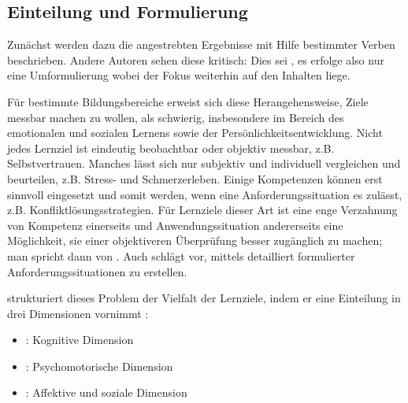 \documentclass[
  twoside,
  parskip=half-,
]{scrreprt}
\begin{document}
\subsection{Einteilung und Formulierung}
Zunächst werden dazu die angestrebten Ergebnisse mit Hilfe bestimmter Verben beschrieben.  Andere Autoren sehen diese  kritisch: Dies sei , es erfolge also nur eine Umformulierung wobei der Fokus weiterhin auf den Inhalten liege.

Für bestimmte Bildungsbereiche erweist sich diese Herangehensweise, Ziele messbar machen zu wollen, als schwierig, insbesondere im Bereich des emotionalen und sozialen Lernens sowie der Persönlichkeitsentwicklung. Nicht jedes Lernziel ist eindeutig beobachtbar oder objektiv messbar, z.B.  Selbstvertrauen. Manches lässt sich nur subjektiv und individuell vergleichen und beurteilen, z.B. Stress- und Schmerzerleben. Einige Kompetenzen können erst sinnvoll eingesetzt und somit  werden, wenn eine Anforderungssituation es zulässt, z.B. Konfliktlösungsstrategien. Für Lernziele dieser Art ist eine enge Verzahnung von Kompetenz einerseits und Anwendungssituation andererseits eine Möglichkeit, sie einer objektiveren Überprüfung besser zugänglich zu machen; man spricht dann von  \autocite[21]{kos}. Auch \citeauthor{arnold} schlägt vor, mittels detailliert formulierter Anforderungssituationen  zu erstellen.

\citeauthor{schlutz} strukturiert dieses Problem der Vielfalt der Lernziele, indem er eine Einteilung in drei Dimensionen vornimmt \autocite[97]{schlutz}:
\begin{itemize}
  \item {}: Kognitive Dimension
  \item {}: Psychomotorische Dimension
  \item {}: Affektive und soziale Dimension
\end{itemize}
\end{document}
